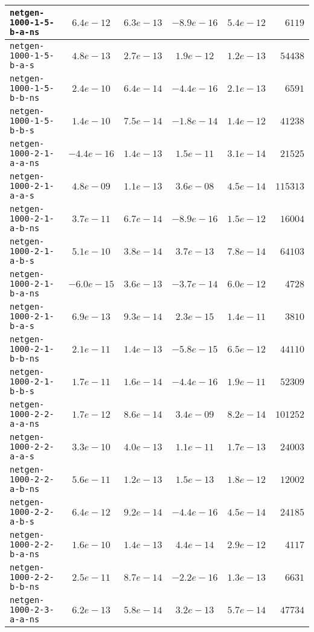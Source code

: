 \begin{center}
\begin{longtable}{|l || c | c | c | c | r|}
\hline
\texttt{netgen-1000-1-5-b-a-ns} & $6.4e-12$ & $6.3e-13$ & $-8.9e-16$ & $5.4e-12$ & $6119$ \\
\hline
\texttt{netgen-1000-1-5-b-a-s} & $4.8e-13$ & $2.7e-13$ & $1.9e-12$ & $1.2e-13$ & $54438$ \\
\hline
\texttt{netgen-1000-1-5-b-b-ns} & $2.4e-10$ & $6.4e-14$ & $-4.4e-16$ & $2.1e-13$ & $6591$ \\
\hline
\texttt{netgen-1000-1-5-b-b-s} & $1.4e-10$ & $7.5e-14$ & $-1.8e-14$ & $1.4e-12$ & $41238$ \\
\hline
\texttt{netgen-1000-2-1-a-a-ns} & $-4.4e-16$ & $1.4e-13$ & $1.5e-11$ & $3.1e-14$ & $21525$ \\
\hline
\texttt{netgen-1000-2-1-a-a-s} & $4.8e-09$ & $1.1e-13$ & $3.6e-08$ & $4.5e-14$ & $115313$ \\
\hline
\texttt{netgen-1000-2-1-a-b-ns} & $3.7e-11$ & $6.7e-14$ & $-8.9e-16$ & $1.5e-12$ & $16004$ \\
\hline
\texttt{netgen-1000-2-1-a-b-s} & $5.1e-10$ & $3.8e-14$ & $3.7e-13$ & $7.8e-14$ & $64103$ \\
\hline
\texttt{netgen-1000-2-1-b-a-ns} & $-6.0e-15$ & $3.6e-13$ & $-3.7e-14$ & $6.0e-12$ & $4728$ \\
\hline
\texttt{netgen-1000-2-1-b-a-s} & $6.9e-13$ & $9.3e-14$ & $2.3e-15$ & $1.4e-11$ & $3810$ \\
\hline
\texttt{netgen-1000-2-1-b-b-ns} & $2.1e-11$ & $1.4e-13$ & $-5.8e-15$ & $6.5e-12$ & $44110$ \\
\hline
\texttt{netgen-1000-2-1-b-b-s} & $1.7e-11$ & $1.6e-14$ & $-4.4e-16$ & $1.9e-11$ & $52309$ \\
\hline
\texttt{netgen-1000-2-2-a-a-ns} & $1.7e-12$ & $8.6e-14$ & $3.4e-09$ & $8.2e-14$ & $101252$ \\
\hline
\texttt{netgen-1000-2-2-a-a-s} & $3.3e-10$ & $4.0e-13$ & $1.1e-11$ & $1.7e-13$ & $24003$ \\
\hline
\texttt{netgen-1000-2-2-a-b-ns} & $5.6e-11$ & $1.2e-13$ & $1.5e-13$ & $1.8e-12$ & $12002$ \\
\hline
\texttt{netgen-1000-2-2-a-b-s} & $6.4e-12$ & $9.2e-14$ & $-4.4e-16$ & $4.5e-14$ & $24185$ \\
\hline
\texttt{netgen-1000-2-2-b-a-ns} & $1.6e-10$ & $1.4e-13$ & $4.4e-14$ & $2.9e-12$ & $4117$ \\
\hline
\texttt{netgen-1000-2-2-b-b-ns} & $2.5e-11$ & $8.7e-14$ & $-2.2e-16$ & $1.3e-13$ & $6631$ \\
\hline
\texttt{netgen-1000-2-3-a-a-ns} & $6.2e-13$ & $5.8e-14$ & $3.2e-13$ & $5.7e-14$ & $47734$ \\

\end{longtable}
\end{center}
